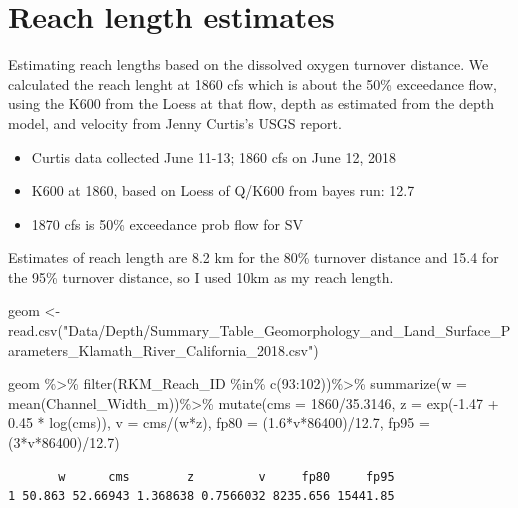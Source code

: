 \documentclass[
  letterpaper,
  DIV=11,
  numbers=noendperiod]{scrartcl}
\newenvironment{Shaded}{\begin{snugshade}}{\end{snugshade}}
\newcommand{\AttributeTok}[1]{\textcolor[rgb]{0.40,0.45,0.13}{#1}}
\newcommand{\DecValTok}[1]{\textcolor[rgb]{0.68,0.00,0.00}{#1}}
\newcommand{\FloatTok}[1]{\textcolor[rgb]{0.68,0.00,0.00}{#1}}
\newcommand{\FunctionTok}[1]{\textcolor[rgb]{0.28,0.35,0.67}{#1}}
\newcommand{\NormalTok}[1]{\textcolor[rgb]{0.00,0.23,0.31}{#1}}
\newcommand{\OtherTok}[1]{\textcolor[rgb]{0.00,0.23,0.31}{#1}}
\newcommand{\SpecialCharTok}[1]{\textcolor[rgb]{0.37,0.37,0.37}{#1}}
\newcommand{\StringTok}[1]{\textcolor[rgb]{0.13,0.47,0.30}{#1}}
\providecommand{\tightlist}{%
  \setlength{\itemsep}{0pt}\setlength{\parskip}{0pt}}\usepackage{longtable,booktabs,array}
\begin{document}
\normalsize

\section{Reach length estimates}\label{reach-length-estimates}

Estimating reach lengths based on the dissolved oxygen turnover
distance. We calculated the reach lenght at 1860 cfs which is about the
50\% exceedance flow, using the K600 from the Loess at that flow, depth
as estimated from the depth model, and velocity from Jenny Curtis's USGS
report.

\begin{itemize}
\tightlist
\item
  Curtis data collected June 11-13; 1860 cfs on June 12, 2018
\item
  K600 at 1860, based on Loess of Q/K600 from bayes run: 12.7
\item
  1870 cfs is 50\% exceedance prob flow for SV
\end{itemize}

Estimates of reach length are 8.2 km for the 80\% turnover distance and
15.4 for the 95\% turnover distance, so I used 10km as my reach length.

\small

\begin{Shaded}
\begin{Highlighting}[]
\NormalTok{geom }\OtherTok{\textless{}{-}} \FunctionTok{read.csv}\NormalTok{(}\StringTok{"Data/Depth/Summary\_Table\_Geomorphology\_and\_Land\_Surface\_Parameters\_Klamath\_River\_California\_2018.csv"}\NormalTok{)}

\NormalTok{geom }\SpecialCharTok{\%\textgreater{}\%} \FunctionTok{filter}\NormalTok{(RKM\_Reach\_ID }\SpecialCharTok{\%in\%} \FunctionTok{c}\NormalTok{(}\DecValTok{93}\SpecialCharTok{:}\DecValTok{102}\NormalTok{))}\SpecialCharTok{\%\textgreater{}\%}
  \FunctionTok{summarize}\NormalTok{(}\AttributeTok{w =} \FunctionTok{mean}\NormalTok{(Channel\_Width\_m))}\SpecialCharTok{\%\textgreater{}\%}
  \FunctionTok{mutate}\NormalTok{(}\AttributeTok{cms =} \DecValTok{1860}\SpecialCharTok{/}\FloatTok{35.3146}\NormalTok{,}
         \AttributeTok{z =} \FunctionTok{exp}\NormalTok{(}\SpecialCharTok{{-}}\FloatTok{1.47} \SpecialCharTok{+} \FloatTok{0.45} \SpecialCharTok{*} \FunctionTok{log}\NormalTok{(cms)),}
         \AttributeTok{v =}\NormalTok{ cms}\SpecialCharTok{/}\NormalTok{(w}\SpecialCharTok{*}\NormalTok{z),}
         \AttributeTok{fp80 =}\NormalTok{ (}\FloatTok{1.6}\SpecialCharTok{*}\NormalTok{v}\SpecialCharTok{*}\DecValTok{86400}\NormalTok{)}\SpecialCharTok{/}\FloatTok{12.7}\NormalTok{,}
         \AttributeTok{fp95 =}\NormalTok{ (}\DecValTok{3}\SpecialCharTok{*}\NormalTok{v}\SpecialCharTok{*}\DecValTok{86400}\NormalTok{)}\SpecialCharTok{/}\FloatTok{12.7}\NormalTok{)}
\end{Highlighting}
\end{Shaded}

\begin{verbatim}
       w      cms        z         v     fp80     fp95
1 50.863 52.66943 1.368638 0.7566032 8235.656 15441.85
\end{verbatim}

\normalsize
\end{document}

